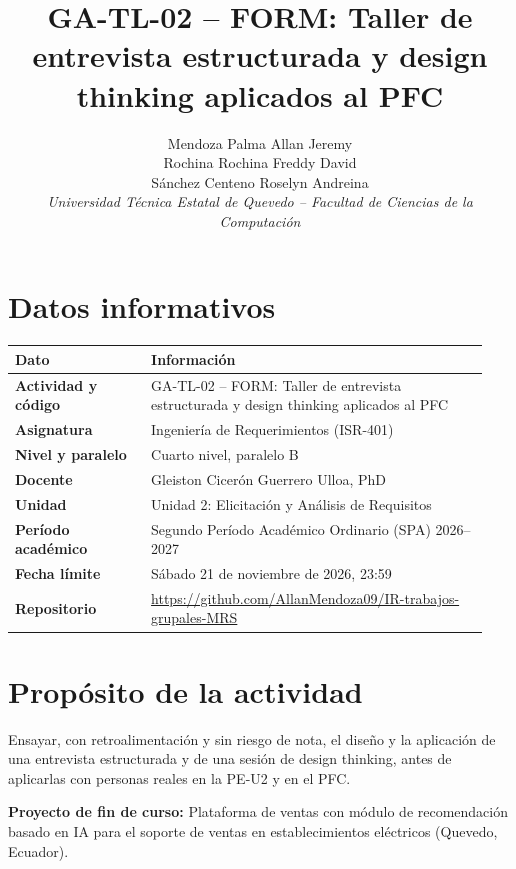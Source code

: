 \documentclass[onecolumn,12pt]{IEEEtran}
\title{GA-TL-02 -- FORM: Taller de entrevista estructurada y design thinking aplicados al PFC}
\author{Mendoza Palma Allan Jeremy \\
Rochina Rochina Freddy David \\
Sánchez Centeno Roselyn Andreina \\
\textit{Universidad Técnica Estatal de Quevedo -- Facultad de Ciencias de la Computación}}
\begin{document}
\maketitle

\section{Datos informativos}
\renewcommand{\arraystretch}{1.15}
\begin{longtable}{@{}>{\bfseries}p{0.27\linewidth}p{0.67\linewidth}@{}}
\toprule
Dato & Información \\
\midrule
Actividad y código & GA-TL-02 -- FORM: Taller de entrevista estructurada y design thinking aplicados al PFC \\
Asignatura & Ingeniería de Requerimientos (ISR-401) \\
Nivel y paralelo & Cuarto nivel, paralelo B \\
Docente & Gleiston Cicerón Guerrero Ulloa, PhD \\
Unidad & Unidad 2: Elicitación y Análisis de Requisitos \\
Período académico & Segundo Período Académico Ordinario (SPA) 2026--2027 \\
Fecha límite & Sábado 21 de noviembre de 2026, 23:59 \\
Repositorio & \url{https://github.com/AllanMendoza09/IR-trabajos-grupales-MRS} \\
\bottomrule
\end{longtable}

\section{Propósito de la actividad}
Ensayar, con retroalimentación y sin riesgo de nota, el diseño y la aplicación de una entrevista estructurada y de una sesión de design thinking, antes de aplicarlas con personas reales en la PE-U2 y en el PFC.

\noindent\textbf{Proyecto de fin de curso:} Plataforma de ventas con módulo de recomendación basado en IA para el soporte de ventas en establecimientos eléctricos (Quevedo, Ecuador).








\nocite{pohl2025,ireb2026,lopdp2021,acm2018}


\end{document}
